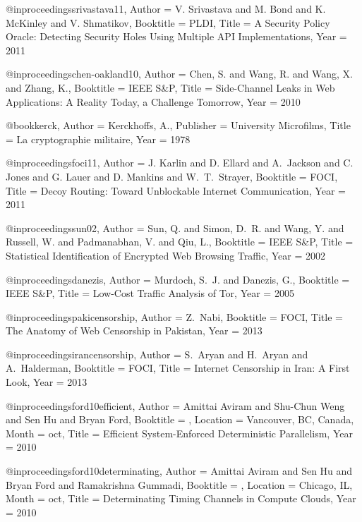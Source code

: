 {{@inproceedings{srivastava11,
	Author = {V. Srivastava and M. Bond and K. McKinley and V. Shmatikov},
	Booktitle = {PLDI},
	Title = {{A Security Policy Oracle: Detecting Security Holes Using Multiple API Implementations}},
	Year = {2011}}

@inproceedings{chen-oakland10,
	Author = {Chen, S. and Wang, R. and Wang, X. and Zhang, K.},
	Booktitle = {IEEE S\&P},
	Title = {{Side-Channel Leaks in Web Applications: A Reality Today, a Challenge Tomorrow}},
	Year = {2010}}

@book{kerck,
	Author = {Kerckhoffs, A.},
	Publisher = {University Microfilms},
	Title = {{La cryptographie militaire}},
	Year = {1978}}

@inproceedings{foci11,
	Author = {J. Karlin and D. Ellard and A.~Jackson and C.~ Jones and G. Lauer and D. Mankins and W.~T.~Strayer},
	Booktitle = {FOCI},
	Title = {{Decoy Routing: Toward Unblockable Internet Communication}},
	Year = 2011}

@inproceedings{sun02,
	Author = {Sun, Q. and Simon, D.~R. and Wang, Y. and Russell, W. and Padmanabhan, V. and Qiu, L.},
	Booktitle = {IEEE S\&P},
	Title = {{Statistical Identification of Encrypted Web Browsing Traffic}},
	Year = {2002}}

@inproceedings{danezis,
	Author = {Murdoch, S.~J. and Danezis, G.},
	Booktitle = {IEEE S\&P},
	Title = {{Low-Cost Traffic Analysis of Tor}},
	Year = {2005}}

@inproceedings{pakicensorship,
	Author = {Z.~Nabi},
	Booktitle = {FOCI},
	Title = {The Anatomy of {Web} Censorship in {Pakistan}},
	Year = {2013}}

@inproceedings{irancensorship,
	Author = {S.~Aryan and H.~Aryan and A.~Halderman},
	Booktitle = {FOCI},
	Title = {Internet Censorship in {Iran}: {A} First Look},
	Year = {2013}}

@inproceedings{ford10efficient,
	Author = {Amittai Aviram and Shu-Chun Weng and Sen Hu and Bryan Ford},
	Booktitle = {},
	Location = {Vancouver, BC, Canada},
	Month = oct,
	Title = {Efficient System-Enforced Deterministic Parallelism},
	Year = 2010}

@inproceedings{ford10determinating,
	Author = {Amittai Aviram and Sen Hu and Bryan Ford and Ramakrishna Gummadi},
	Booktitle = {},
	Location = {Chicago, IL},
	Month = oct,
	Title = {Determinating Timing Channels in Compute Clouds},
	Year = 2010}

}}
